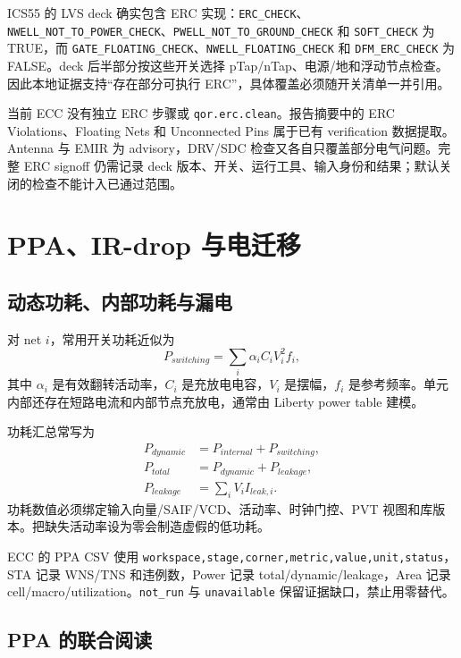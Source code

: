\documentclass[UTF8,a4paper,11pt,fontset=fandol]{ctexart}
\numberwithin{equation}{section}
\newcommand{\code}[1]{\nolinkurl{#1}}
\begin{document}
ICS55 的 LVS deck 确实包含 ERC 实现：\code{ERC_CHECK}、\code{NWELL_NOT_TO_POWER_CHECK}、\code{PWELL_NOT_TO_GROUND_CHECK} 和 \code{SOFT_CHECK} 为 TRUE，而 \code{GATE_FLOATING_CHECK}、\code{NWELL_FLOATING_CHECK} 和 \code{DFM_ERC_CHECK} 为 FALSE。deck 后半部分按这些开关选择 pTap/nTap、电源/地和浮动节点检查。因此本地证据支持“存在部分可执行 ERC”，具体覆盖必须随开关清单一并引用\cite{pdkrules}。

当前 ECC 没有独立 ERC 步骤或 \code{qor.erc.clean}。报告摘要中的 ERC Violations、Floating Nets 和 Unconnected Pins 属于已有 verification 数据提取。Antenna 与 EMIR 为 advisory，DRV/SDC 检查又各自只覆盖部分电气问题。完整 ERC signoff 仍需记录 deck 版本、开关、运行工具、输入身份和结果；默认关闭的检查不能计入已通过范围。

\section{PPA、IR-drop 与电迁移}

\subsection{动态功耗、内部功耗与漏电}

对 net $i$，常用开关功耗近似为
\begin{equation}
P_{switching}=\sum_i\alpha_iC_iV_i^2f_i,
\end{equation}
其中 $\alpha_i$ 是有效翻转活动率，$C_i$ 是充放电电容，$V_i$ 是摆幅，$f_i$ 是参考频率\cite{weste}。单元内部还存在短路电流和内部节点充放电，通常由 Liberty power table 建模。

功耗汇总常写为
\begin{align}
P_{dynamic}&=P_{internal}+P_{switching},\\
P_{total}&=P_{dynamic}+P_{leakage},\\
P_{leakage}&=\sum_iV_iI_{leak,i}.
\end{align}
功耗数值必须绑定输入向量/SAIF/VCD、活动率、时钟门控、PVT 视图和库版本。把缺失活动率设为零会制造虚假的低功耗。

ECC 的 PPA CSV 使用 \code{workspace,stage,corner,metric,value,unit,status}，STA 记录 WNS/TNS 和违例数，Power 记录 total/dynamic/leakage，Area 记录 cell/macro/utilization。\code{not_run} 与 \code{unavailable} 保留证据缺口，禁止用零替代。

\subsection{PPA 的联合阅读}
\end{document}
